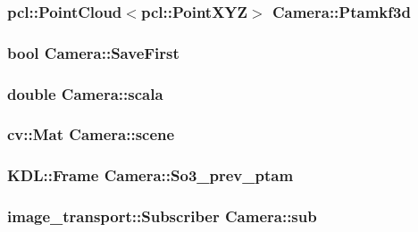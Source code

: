 \hypertarget{classCamera_aef0d78eacbae15e72cb30d59083f3e03}{
\subsubsection[{Ptamkf3d}]{\setlength{\rightskip}{0pt plus 5cm}pcl\-::\-Point\-Cloud$<$pcl\-::\-Point\-X\-Y\-Z$>$ Camera\-::\-Ptamkf3d}}\label{classCamera_aef0d78eacbae15e72cb30d59083f3e03}
\hypertarget{classCamera_ab64f4cee999ddfe78d5da5378bcf7e55}{
\subsubsection[{Save\-First}]{\setlength{\rightskip}{0pt plus 5cm}bool Camera\-::\-Save\-First}}\label{classCamera_ab64f4cee999ddfe78d5da5378bcf7e55}
\hypertarget{classCamera_a724680ff9b6d9941710e45006d7c3654}{
\subsubsection[{scala}]{\setlength{\rightskip}{0pt plus 5cm}double Camera\-::scala}}\label{classCamera_a724680ff9b6d9941710e45006d7c3654}
\hypertarget{classCamera_a1472be6a92f776d41cc12ebb6529fc74}{
\subsubsection[{scene}]{\setlength{\rightskip}{0pt plus 5cm}cv\-::\-Mat Camera\-::scene}}\label{classCamera_a1472be6a92f776d41cc12ebb6529fc74}
\hypertarget{classCamera_afeaeb3e97cc648f250da792c08efd97d}{
\subsubsection[{So3\-\_\-prev\-\_\-ptam}]{\setlength{\rightskip}{0pt plus 5cm}K\-D\-L\-::\-Frame Camera\-::\-So3\-\_\-prev\-\_\-ptam}}\label{classCamera_afeaeb3e97cc648f250da792c08efd97d}
\hypertarget{classCamera_aa4d0866cc975c1f0383e3e46bc7a2f6c}{
\subsubsection[{sub}]{\setlength{\rightskip}{0pt plus 5cm}image\-\_\-transport\-::\-Subscriber Camera\-::sub}}\label{classCamera_aa4d0866cc975c1f0383e3e46bc7a2f6c}
